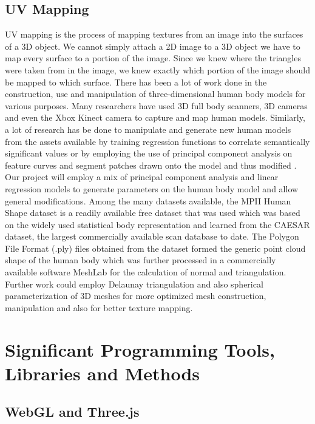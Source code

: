 \documentclass{article}
\begin{document}
\subsection {UV Mapping}
UV mapping is the process of mapping textures from an image into the surfaces of a 3D object. We cannot simply attach a 2D image to a 3D object we have to map every surface to a portion of the image. Since we knew where the triangles were taken from in the image, we knew exactly which portion of the image should be mapped to which surface.
There has been a lot of work done in the construction, use and manipulation of three-dimensional human body models for various purposes. Many researchers have used 3D full body scanners, 3D cameras and even the Xbox Kinect camera to capture and map human models. Similarly, a lot of research has be done to manipulate and generate new human models from the assets available by training regression functions to correlate semantically significant values \cite{Exemplar} or by employing the
use of principal component analysis on feature curves and segment patches drawn onto the model
and thus modified \cite{Exemplar}. Our project will employ a mix of principal component analysis and linear
regression models to generate parameters on the human body model and allow general
modifications.
Among the many datasets available, the MPII Human Shape dataset \cite{StatisticalShapeSpaces} \cite{poisson} is a readily available free
dataset that was used which was based on the widely used statistical body representation and
learned from the CAESAR dataset, the largest commercially available scan database to date. The
Polygon File Format (.ply) files obtained from the dataset formed the generic point cloud shape of
the human body which was further processed in a commercially available software MeshLab \cite{meshlab} \cite{poisson} for the calculation of normal and triangulation. Further work could employ Delaunay
triangulation and also spherical parameterization of 3D meshes \cite{sphericalParam} for more optimized mesh
construction, manipulation and also for better texture mapping.


\newpage
\section{Significant Programming Tools, Libraries and Methods}

	\subsection{WebGL and Three.js}
\end{document}

